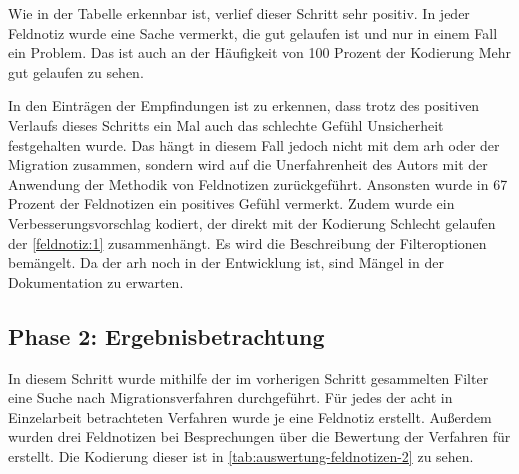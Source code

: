 

Wie in der Tabelle erkennbar ist, verlief dieser Schritt sehr positiv.
In jeder Feldnotiz wurde eine Sache vermerkt, die gut gelaufen ist und nur in einem Fall ein Problem.
Das ist auch an der Häufigkeit von 100 Prozent der Kodierung \glqq Mehr gut gelaufen\grqq{} zu sehen.

In den Einträgen der Empfindungen ist zu erkennen, dass trotz des positiven Verlaufs dieses Schritts ein Mal auch das schlechte Gefühl \glqq Unsicherheit\grqq{} festgehalten wurde.
Das hängt in diesem Fall jedoch nicht mit dem \gls{arh} oder der Migration zusammen, sondern wird auf die Unerfahrenheit des Autors mit der Anwendung der Methodik von Feldnotizen zurückgeführt.
Ansonsten wurde in 67 Prozent der Feldnotizen ein positives Gefühl vermerkt.
Zudem wurde ein Verbesserungsvorschlag kodiert, der direkt mit der Kodierung \glqq Schlecht gelaufen\grqq{} der \cref{feldnotiz:1} zusammenhängt.
Es wird die Beschreibung der Filteroptionen bemängelt.
Da der \gls{arh} noch in der Entwicklung ist, sind Mängel in der Dokumentation zu erwarten.

\subsection{Phase 2: Ergebnisbetrachtung}

In diesem Schritt wurde mithilfe der im vorherigen Schritt gesammelten Filter eine Suche nach Migrationsverfahren durchgeführt.
Für jedes der acht in Einzelarbeit betrachteten Verfahren wurde je eine Feldnotiz erstellt. 
Außerdem wurden drei Feldnotizen bei Besprechungen über die Bewertung der Verfahren für \jf erstellt.
Die Kodierung dieser ist in \cref{tab:auswertung-feldnotizen-2} zu sehen.



